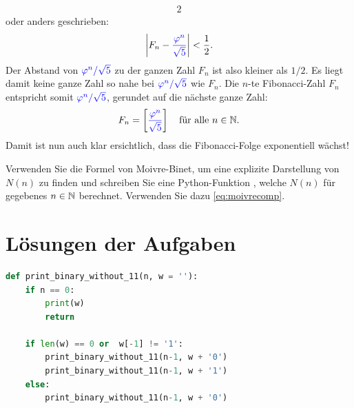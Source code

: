 {\begin{alignat*}{2}
	\end{alignat*}
	oder anders geschrieben:
	\begin{align*}
		\left\lvert F_n-\textcolor{blue}{\frac{\varphi^n}{\sqrt{5}}}\right\rvert < \frac{1}{2}.
	\end{align*}
	Der Abstand von $\textcolor{Blue}{\varphi^n/\sqrt{5}}$ zu der ganzen Zahl $F_n$ ist also kleiner als $1/2$. Es liegt damit keine ganze Zahl so nahe bei $\textcolor{Blue}{\varphi^n/\sqrt{5}}$ wie $F_n$. Die $n$-te Fibonacci-Zahl $F_n$ entspricht somit $\textcolor{Blue}{\varphi^n/\sqrt{5}}$, gerundet auf die nächste ganze Zahl:
	\begin{align}\label{eq:moivrecomp}
		F_n = \left[\textcolor{blue}{\frac{\varphi^n}{\sqrt{5}}}\right] \quad\text{für alle } n\in\mathbb{N}.
	\end{align}
	Damit ist nun auch klar ersichtlich, dass die Fibonacci-Folge exponentiell wächst!
}

\begin{myexercise}\label{myexercise:0406}
	Verwenden Sie die Formel von Moivre-Binet, um eine explizite Darstellung von $N(n)$ zu finden und schreiben Sie eine Python-Funktion , welche $N(n)$ für gegebenes $n\in\mathbb{N}$ berechnet. Verwenden Sie dazu \cref{eq:moivrecomp}.
\end{myexercise}

\clearpage
\section{Lösungen der Aufgaben}

\begin{myanswer}[myexercise:0401]
	\begin{lstlisting}[language=Python,caption=binäre Strings ohne $11$]
def print_binary_without_11(n, w = ''):
    if n == 0:
        print(w)
        return
    
    if len(w) == 0 or  w[-1] != '1':
        print_binary_without_11(n-1, w + '0')
        print_binary_without_11(n-1, w + '1')
    else:
        print_binary_without_11(n-1, w + '0')
\end{lstlisting}
\end{myanswer}

